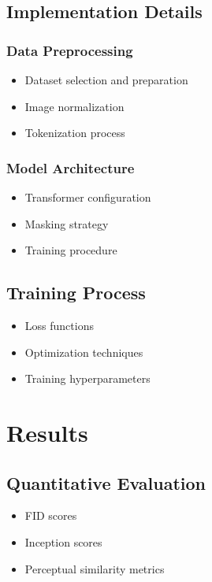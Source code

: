 \subsection{Implementation Details}
\subsubsection{Data Preprocessing}
\begin{itemize}
    \item Dataset selection and preparation
    \item Image normalization
    \item Tokenization process
\end{itemize}

\subsubsection{Model Architecture}
\begin{itemize}
    \item Transformer configuration
    \item Masking strategy
    \item Training procedure
\end{itemize}

\subsection{Training Process}
\begin{itemize}
    \item Loss functions
    \item Optimization techniques
    \item Training hyperparameters
\end{itemize}

\section{Results}
\subsection{Quantitative Evaluation}
\begin{itemize}
    \item FID scores
    \item Inception scores
    \item Perceptual similarity metrics
\end{itemize}


